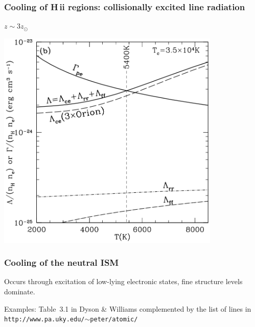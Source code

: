 \begin{frame}
\end{frame} \begin{frame}\frametitle{Cooling of H\,{\sc ii} regions: collisionally excited line radiation}
$z \sim 3 z_{\odot}$
\begin{center}
\includegraphics[width=0.8\textwidth,height=!]{./B/cooling_3x.png}
\end{center}






\end{frame} \begin{frame}\frametitle{Cooling of the neutral ISM}


Occurs through excitation of low-lying electronic states, fine
structure levels dominate.

Examples: Table~3.1 in Dyson \& Williams complemented by the list of
lines in {\tt http://www.pa.uky.edu/$\sim$peter/atomic/}


\end{frame}
